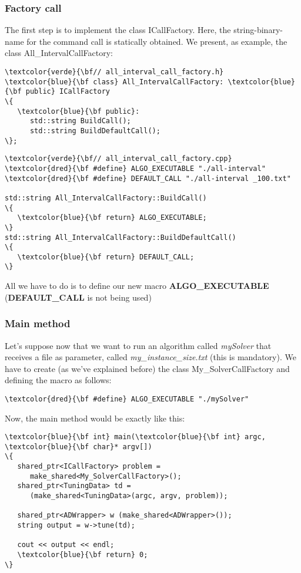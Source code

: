 \subsubsection{Factory call}

The first step is to implement the class {\sc ICallFactory}. Here, the string-binary-name for the command call is statically obtained. We present, as example, the class {\sc All\_IntervalCallFactory}:

\begin{Verbatim}[fontsize=\normalsize]
\textcolor{verde}{\bf// all_interval_call_factory.h}
\textcolor{blue}{\bf class} All_IntervalCallFactory: \textcolor{blue}{\bf public} ICallFactory
\{
   \textcolor{blue}{\bf public}:
      std::string BuildCall();
      std::string BuildDefaultCall();
\};
\end{Verbatim}

\begin{Verbatim}[fontsize=\normalsize]
\textcolor{verde}{\bf// all_interval_call_factory.cpp}
\textcolor{dred}{\bf #define} ALGO_EXECUTABLE "./all-interval"
\textcolor{dred}{\bf #define} DEFAULT_CALL "./all-interval _100.txt"

std::string All_IntervalCallFactory::BuildCall()
\{
   \textcolor{blue}{\bf return} ALGO_EXECUTABLE;
\}
std::string All_IntervalCallFactory::BuildDefaultCall()
\{
   \textcolor{blue}{\bf return} DEFAULT_CALL;
\}
\end{Verbatim}

All we have to do is to define our new macro {\bf ALGO\_EXECUTABLE} ({\bf DEFAULT\_CALL} is not being used)

\subsubsection{Main method}

Let's suppose now that we want to run an algorithm called {\it mySolver} that receives a file as parameter, called {\it my\_instance\_size.txt} (this is mandatory). We have to create (as we've explained before) the class {\sc My\_SolverCallFactory} and defining the macro as follows:

\begin{Verbatim}[fontsize=\normalsize]
\textcolor{dred}{\bf #define} ALGO_EXECUTABLE "./mySolver"
\end{Verbatim}

Now, the main method would be exactly like this:

\begin{Verbatim}[fontsize=\normalsize]
\textcolor{blue}{\bf int} main(\textcolor{blue}{\bf int} argc, \textcolor{blue}{\bf char}* argv[])
\{
   shared_ptr<ICallFactory> problem = 
      make_shared<My_SolverCallFactory>();
   shared_ptr<TuningData> td = 
      (make_shared<TuningData>(argc, argv, problem));

   shared_ptr<ADWrapper> w (make_shared<ADWrapper>());
   string output = w->tune(td);

   cout << output << endl;
   \textcolor{blue}{\bf return} 0;
\}
\end{Verbatim}

